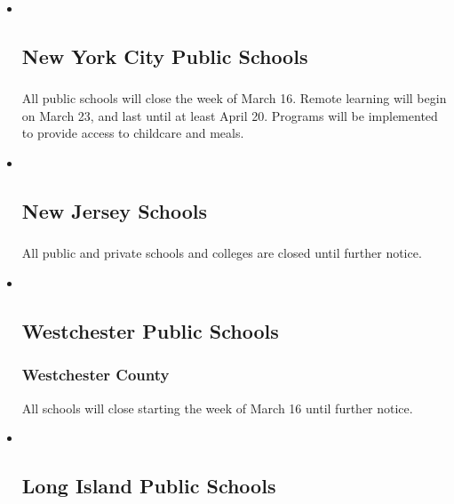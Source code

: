 \begin{itemize}
\item ~
  \hypertarget{new-york-city-public-schools}{%
  \subsection{New York City Public
  Schools}\label{new-york-city-public-schools}}

  \subsubsection{}

  All public schools will close the week of March 16. Remote learning
  will begin on March 23, and last until at least April 20. Programs
  will be implemented to provide access to childcare and meals.
\item ~
  \hypertarget{new-jersey-schools}{%
  \subsection{New Jersey Schools}\label{new-jersey-schools}}

  \hypertarget{-1}{%
  \subsubsection{}\label{-1}}

  All public and private schools and colleges are closed until further
  notice.
\item ~
  \hypertarget{westchester-public-schools}{%
  \subsection{Westchester Public
  Schools}\label{westchester-public-schools}}

  \hypertarget{westchester-county}{%
  \subsubsection{Westchester County}\label{westchester-county}}

  All schools will close starting the week of March 16 until further
  notice.
\item ~
  \hypertarget{long-island-public-schools}{%
  \subsection{Long Island Public
  Schools}\label{long-island-public-schools}}


\end{itemize}
